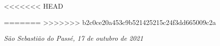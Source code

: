\documentclass[10.8pt, a4paper]{article}
\begin{document}

\vspace{1cm}



<<<<<<< HEAD


=======
>>>>>>> b2c0ce20a453c9b521425215c24f3dd665009c2a
\vspace{1cm}
\begin{flushright}
   \emph{São Sebastião do Passé, 17 de outubro de 2021}
\end{flushright}
\vspace{0.5cm}

\end{document}
